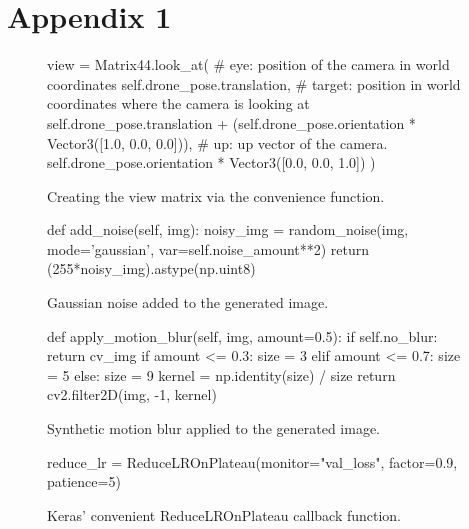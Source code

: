 \chapter{Appendix 1}

\begin{figure}[h - 5em]
	\center
	\begin{python}
		view = Matrix44.look_at(
			# eye: position of the camera in world coordinates
			self.drone_pose.translation,
			# target: position in world coordinates where the camera is looking at
			self.drone_pose.translation + (self.drone_pose.orientation *
										   Vector3([1.0, 0.0, 0.0])),
			# up: up vector of the camera.
			self.drone_pose.orientation * Vector3([0.0, 0.0, 1.0])
		)
	\end{python}
	\caption[The  function]{Creating the view matrix via the
	convenience  function.}
\end{figure}
\begin{figure}[h!]
    \centering
    \begin{python}
        def add_noise(self, img):
            noisy_img = random_noise(img, mode='gaussian',
                                     var=self.noise_amount**2)
            return (255*noisy_img).astype(np.uint8)
    \end{python}
    \caption{Gaussian noise added to the generated image.}
\end{figure}
\begin{figure}[h!]
    \centering
    \begin{python}
        def apply_motion_blur(self, img, amount=0.5):
            if self.no_blur: return cv_img
            if amount <= 0.3:
                size = 3
            elif amount <= 0.7:
                size = 5
            else:
                size = 9
            kernel = np.identity(size) / size
            return cv2.filter2D(img, -1, kernel)
    \end{python}
    \caption{Synthetic motion blur applied to the generated image.}
\end{figure}
\begin{figure}[h!]
    \centering
    \begin{python}
reduce_lr = ReduceLROnPlateau(monitor="val_loss", factor=0.9, patience=5)
    \end{python}
    \caption{Keras' convenient ReduceLROnPlateau callback function.}
\end{figure}
